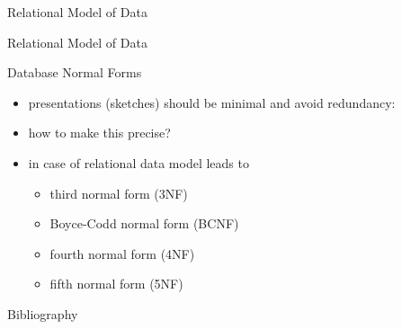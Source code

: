 \documentclass[xcolor=pst,dvips]{beamer}   %
\renewcommand{\erpictureFolder}[0]{../../SharedPictures}
\begin{document}
\begin{frame}{Relational Model of Data}
\scalebox{0.6}{

}
\end{frame}

\begin{frame}{Relational Model of Data}
\scalebox{0.6}{

}
\end{frame}

\begin{frame}{Database Normal Forms}
\begin{itemize}
\item presentations (sketches) should be minimal and avoid redundancy:
\item how to make this precise?
\item in case of relational data model leads to 
   \begin{itemize}
     \item third normal form (3NF)
     \item Boyce-Codd normal form (BCNF)
     \item fourth normal form (4NF)
     \item fifth normal form (5NF)
   \end{itemize}
\end{itemize}
\end{frame}



\begin{frame}{Bibliography}

\end{frame}
\end{document}
